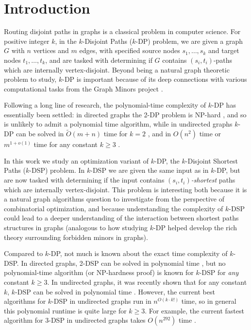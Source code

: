 \documentclass[11pt]{article}
\newcommand{\NP}{\textsf{NP}\xspace}
\theoremstyle{definition}
\begin{document}
\section{Introduction}
\label{sec:intro}

Routing disjoint paths in graphs is a classical problem in computer science.
For positive integer $k$, in the \textsf{$k$-Disjoint Paths ($k$-DP)} problem, we are given a graph $G$ with $n$ vertices and $m$ edges, with specified source nodes $s_1, \dots, s_k$ and target nodes $t_1, \dots, t_k$, and are tasked with determining if $G$ contains $(s_i,t_i)$-paths which are internally vertex-disjoint.
Beyond being a natural graph theoretic problem to study, \textsf{$k$-DP}  is important because of its deep connections with various computational tasks from the Graph Minors project \cite{RobertsonSeymour1995}.

Following a long line of research, the polynomial-time complexity of \textsf{$k$-DP} has essentially been settled: in directed graphs the \textsf{2-DP} problem is \NP-hard \cite[Lemma 3]{FortuneHopcroftWyllie1980}, and so is unlikely to admit a polynomial time algorithm, while in undirected graphs \textsf{$k$-DP} can be solved in $\tilde{O}(m+n)$ time for $k=2$ \cite{Tholey2005}, and in $O(n^2)$ time or $m^{1+o(1)}$ time for any constant $k\ge 3$ \cite{KawarabayashiKobayashiReed2012,KPS2024}. 

In this work we study an optimization variant of \textsf{$k$-DP}, the \textsf{$k$-Disjoint Shortest Paths ($k$-DSP)} problem.
In \textsf{$k$-DSP} we are given the same input as in \textsf{$k$-DP}, but are now tasked with determining if the input  contains \emph{$(s_i,t_i)$-shortest} paths which are internally vertex-disjoint.
This problem is interesting both because it is a natural graph algorithms question to investigate from the perspective of combinatorial optimization, and because understanding the complexity of \textsf{$k$-DSP} could lead to a deeper understanding of the interaction between shortest paths structures in graphs (analogous to how studying \textsf{$k$-DP} helped develop the rich theory surrounding forbidden minors in graphs). 

Compared to \textsf{$k$-DP}, not much is known about the exact time complexity of \textsf{$k$-DSP}.
In directed graphs, \textsf{2-DSP} can be solved in polynomial time \cite{BercziKobayashi2017}, but no polynomial-time algorithm (or \NP-hardness proof) is known for \textsf{$k$-DSP} for \emph{any} constant $k\ge 3$.
In undirected graphs, it was recently shown that for any constant $k$, \textsf{$k$-DSP} can be solved in polynomial time \cite{Lochet2021}. 
However,
the current best algorithms for \textsf{$k$-DSP} in undirected graphs run in 
$n^{O(k\cdot k!)}$ time, so in general this polynomial runtime is quite large for $k\ge 3$.
For example, the current fastest algorithm for \textsf{3-DSP} in undirected graphs takes $O(n^{292})$ time \cite{Geometric-Lens-conf}.
\end{document}
